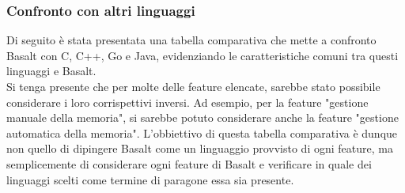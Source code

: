 \subsubsection{Confronto con altri linguaggi}
Di seguito è stata presentata una tabella comparativa che mette a confronto Basalt con C, C++, Go e Java, evidenziando 
le caratteristiche comuni tra questi linguaggi e Basalt. \\

Si tenga presente che per molte delle feature elencate, sarebbe stato possibile considerare i loro corrispettivi inversi. Ad
esempio, per la feature "gestione manuale della memoria", si sarebbe potuto considerare anche la feature "gestione automatica della memoria". L'obbiettivo
di questa tabella comparativa è dunque non quello di dipingere Basalt come un linguaggio provvisto di ogni feature, ma semplicemente di considerare ogni feature di 
Basalt e verificare in quale dei linguaggi scelti come termine di paragone essa sia presente. \\

